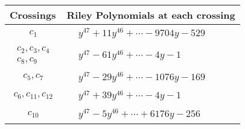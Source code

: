 \documentclass[1p]{elsarticle_modified}
\theoremstyle{definition}
\begin{document}
\begin{tabular}{m{50pt}|m{274pt}}
Crossings & \hspace{64pt}Riley Polynomials at each crossing \\
\hline $$\begin{aligned}c_{1}\end{aligned}$$&$\begin{aligned}
&y^{47}+11 y^{46}+\cdots-9704 y-529
\end{aligned}$\\
\hline $$\begin{aligned}c_{2},c_{3},c_{4}\\c_{8},c_{9}\end{aligned}$$&$\begin{aligned}
&y^{47}-61 y^{46}+\cdots-4 y-1
\end{aligned}$\\
\hline $$\begin{aligned}c_{5},c_{7}\end{aligned}$$&$\begin{aligned}
&y^{47}-29 y^{46}+\cdots-1076 y-169
\end{aligned}$\\
\hline $$\begin{aligned}c_{6},c_{11},c_{12}\end{aligned}$$&$\begin{aligned}
&y^{47}+39 y^{46}+\cdots-4 y-1
\end{aligned}$\\
\hline $$\begin{aligned}c_{10}\end{aligned}$$&$\begin{aligned}
&y^{47}-5 y^{46}+\cdots+6176 y-256
\end{aligned}$\\
\hline
\end{tabular}
\vskip 2pc
\end{document}

